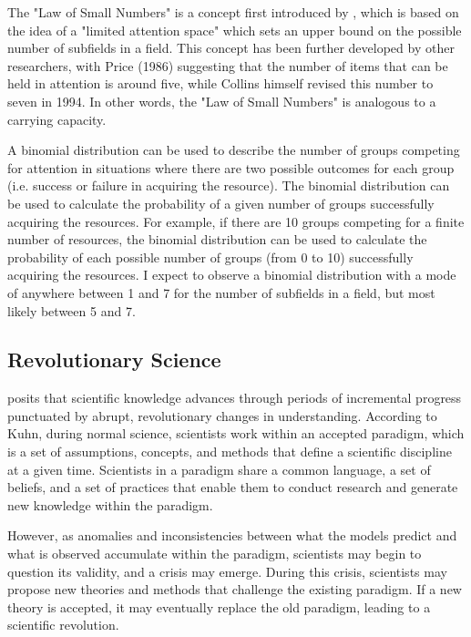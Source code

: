 The "Law of Small Numbers" is a concept first introduced by \cite{collins1998}, which is based on the idea of a "limited attention space" which sets an upper bound on the possible number of subfields in a field. This concept has been further developed by other researchers, with Price (1986) suggesting that the number of items that can be held in attention is around five, while Collins himself revised this number to seven in 1994. In other words, the "Law of Small Numbers" is analogous to a carrying capacity.

A binomial distribution can be used to describe the number of groups competing for attention in situations where there are two possible outcomes for each group (i.e. success or failure in acquiring the resource). The binomial distribution can be used to calculate the probability of a given number of groups successfully acquiring the resources. For example, if there are 10 groups competing for a finite number of resources, the binomial distribution can be used to calculate the probability of each possible number of groups (from 0 to 10) successfully acquiring the resources. I expect to observe a binomial distribution with a mode of anywhere between 1 and 7 for the number of subfields in a field, but most likely between 5 and 7.



\subsection{Revolutionary Science}

\cite{kuhn2012} posits that scientific knowledge advances through periods of incremental progress punctuated by abrupt, revolutionary changes in understanding. According to Kuhn, during normal science, scientists work within an accepted paradigm, which is a set of assumptions, concepts, and methods that define a scientific discipline at a given time. Scientists in a paradigm share a common language, a set of beliefs, and a set of practices that enable them to conduct research and generate new knowledge within the paradigm.

However, as anomalies and inconsistencies between what the models predict and what is observed accumulate within the paradigm, scientists may begin to question its validity, and a crisis may emerge. During this crisis, scientists may propose new theories and methods that challenge the existing paradigm. If a new theory is accepted, it may eventually replace the old paradigm, leading to a scientific revolution.

